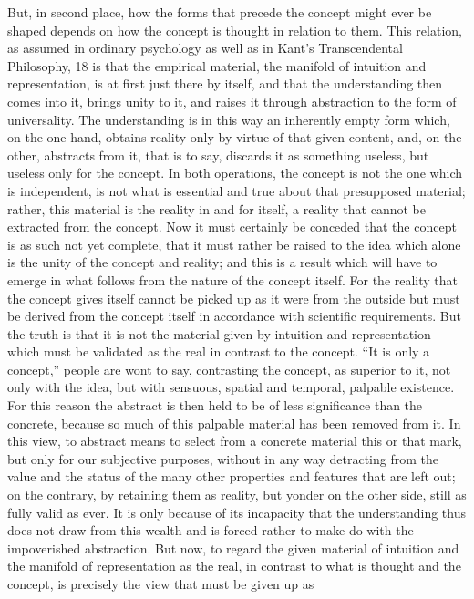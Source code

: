 But, in second place, how the forms that precede the concept might
ever be shaped depends on how the concept is thought in relation to them.
This relation, as assumed in ordinary psychology as well as in Kant’s
Transcendental Philosophy, 18 is that the empirical material, the manifold
of intuition and representation, is at first just there by itself, and that the
understanding then comes into it, brings unity to it, and raises it through
abstraction to the form of universality. The understanding is in this way
an inherently empty form which, on the one hand, obtains reality only by
virtue of that given content, and, on the other, abstracts from it, that is
to say, discards it as something useless, but useless only for the concept.
In both operations, the concept is not the one which is independent, is
not what is essential and true about that presupposed material; rather, this
material is the reality in and for itself, a reality that cannot be extracted
from the concept.
Now it must certainly be conceded that the concept is as such not yet
complete, that it must rather be raised to the idea which alone is the unity
of the concept and reality; and this is a result which will have to emerge
in what follows from the nature of the concept itself.
For the reality that
the concept gives itself cannot be picked up as it were from the outside
but must be derived from the concept itself in accordance with scientific
requirements. But the truth is that it is not the material given by intuition
and representation which must be validated as the real in contrast to the
concept. “It is only a concept,” people are wont to say, contrasting the
concept, as superior to it, not only with the idea, but with sensuous, spatial
and temporal, palpable existence. For this reason the abstract is then held to
be of less significance than the concrete, because so much of this palpable
material has been removed from it. In this view, to abstract means to
select from a concrete material this or that mark, but only for our subjective
purposes, without in any way detracting from the value and the status of
the many other properties and features that are left out; on the contrary,
by retaining them as reality, but yonder on the other side, still as fully
valid as ever. It is only because of its incapacity that the understanding
thus does not draw from this wealth and is forced rather to make do with
the impoverished abstraction. But now, to regard the given material of
intuition and the manifold of representation as the real, in contrast to what
is thought and the concept, is precisely the view that must be given up as
